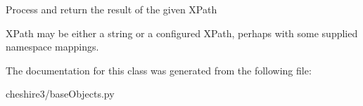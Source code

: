\begin{DoxyVerb}Process and return the result of the given XPath

 XPath may be either a string or a configured XPath, perhaps with some 
 supplied namespace mappings.\end{DoxyVerb}
 

The documentation for this class was generated from the following file\-:\begin{DoxyCompactItemize}
\item 
cheshire3/base\-Objects.\-py\end{DoxyCompactItemize}
